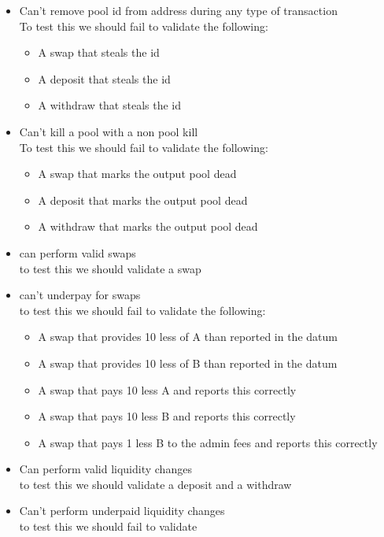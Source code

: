 \documentclass{article}
\begin{document}
\begin{itemize}
	\item Can't remove pool id from address during any type of transaction
		\\ To test this we should fail to validate the following:
		\begin{itemize}
			\item A swap that steals the id
			\item A deposit that steals the id
			\item A withdraw that steals the id
		\end{itemize}
	\item Can't kill a pool with a non pool kill
		\\ To test this we should fail to validate the following:
		\begin{itemize}
			\item A swap that marks the output pool dead
			\item A deposit that marks the output pool dead
			\item A withdraw that marks the output pool dead
		\end{itemize}
	\item can perform valid swaps
		\\ to test this we should validate a swap
	\item can't underpay for swaps
		\\ to test this we should fail to validate the following:
			\begin{itemize}
				\item A swap that provides 10 less of A than reported in the datum
				\item A swap that provides 10 less of B than reported in the datum
				\item A swap that pays 10 less A and reports this correctly
				\item A swap that pays 10 less B and reports this correctly
				\item A swap that pays 1 less B to the admin fees and reports this correctly
			\end{itemize}
	\item Can perform valid liquidity changes
		\\ to test this we should validate a deposit and a withdraw
	\item Can't perform underpaid liquidity changes
		\\ to test this we should fail to validate
			\begin{itemize}

\end{itemize}
\end{itemize}
\end{document}
